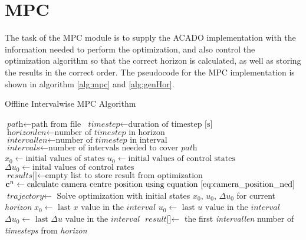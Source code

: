 \section{MPC}

The task of the MPC module is to supply the ACADO implementation with the information needed to perform the optimization, and also control the optimization algorithm so that the correct horizon is calculated, as well as storing the results in the correct order. The pseudocode for the MPC implementation is shown in algorithm \ref{alg:mpc} and \ref{alg:genHor}.

\begin{algorithm}
\caption{Offline Intervalwise MPC Algorithm}
\label{alg:mpc}
\begin{algorithmic}
	\State $\textit{path} \gets \text{path from file}$
	\State $\textit{timestep} \gets \text{duration of timestep [s]}$
	\State $\textit{horizonlen} \gets \text{number of } \textit{timestep} \text{ in horizon}$
	\State $\textit{intervallen} \gets \text{number of } \textit{timestep} \text{ in interval}$
	\State $\textit{intervals} \gets \text{number of intervals needed to cover } \textit{path}$
	\State $\textit{x}_0 \gets \text{initial values of states}$
	\State $\textit{u}_0 \gets \text{initial values of control states}$
	\State $\Delta\textit{u}_0 \gets \text{inital values of control rates}$
	\State $\textit{results[]} \gets \text{empty list to store result from optimization}$
		\State $\mathbf{c}^n \gets \text{calculate camera centre position using equation } \ref{eq:camera_position_ned}$
		\State $\textit{trajectory} \gets$ 
		\State Solve optimization with initial states $x_0$, $u_0$, $\Delta u_0$ for current \textit{horizon}
		\State $\textit{x}_0 \gets \text{ last } \textit{x} \text{ value in the } \textit{interval}$
		\State $\textit{u}_0 \gets \text{ last } \textit{u} \text{ value in the } \textit{interval}$
		\State $\Delta\textit{u}_0 \gets \text{ last } \Delta\textit{u} \text{ value in the } \textit{interval}$
		\State $\textit{result[]} \gets$ the first \textit{intervallen} number of \textit{timesteps} from \textit{horizon}
	\EndFor
\EndProcedure
\end{algorithmic}
\end{algorithm}

